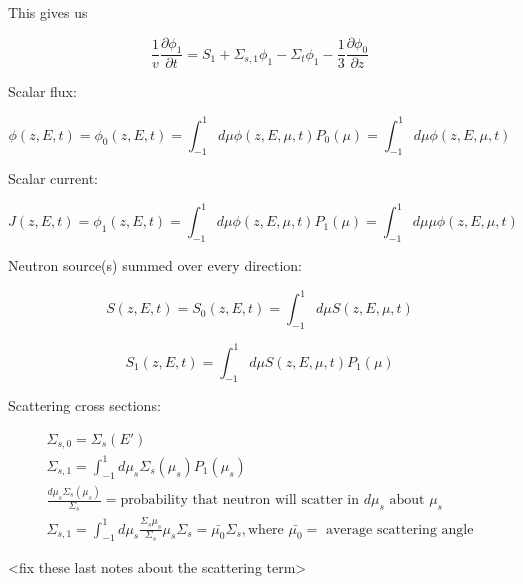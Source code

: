 \documentclass[12pt]{article}
\newcommand{\sigso}{\ensuremath{\Sigma_{s,0}}}
\newcommand{\sigsi}{\ensuremath{\Sigma_{s,1}}}
\begin{document}
This gives us

\begin{equation*}
\frac{1}{v}\frac{\partial\phi_1}{\partial t} = S_1 + \sigsi\phi_1 - \Sigma_t\phi_1 - 
\frac{1}{3}\frac{\partial\phi_0}{\partial z}
\end{equation*}

Scalar flux:

\begin{equation*}
\phi(z,E,t) = \phi_0(z,E,t) = \int_{-1}^{1}d\mu\phi(z,E,\mu,t)P_0(\mu) = \int_{-1}^{1}d\mu\phi(z,E,\mu,t)
\end{equation*}

Scalar current:

\begin{equation*}
J(z,E,t) = \phi_1(z,E,t) = \int_{-1}^{1}d\mu\phi(z,E,\mu,t)P_1(\mu) = \int_{-1}^{1}d\mu\mu\phi(z,E,\mu,t)
\end{equation*}

Neutron source(s) summed over every direction:

\begin{equation*}
S(z,E,t) = S_0(z,E,t) = \int_{-1}^{1}d\mu S(z,E,\mu,t)
\end{equation*}

\begin{equation*}
S_1(z,E,t) = \int_{-1}^1d\mu S(z,E,\mu,t)P_1(\mu)
\end{equation*}

Scattering cross sections:

\begin{gather*}
\sigso = \Sigma_s(E') \\
\sigsi = \int_{-1}^1d\mu_s\Sigma_s(\mu_s)P_1(\mu_s) \\
\frac{d\mu_s\Sigma_s(\mu_s)}{\Sigma_s} = \text{probability that neutron will scatter in $d\mu_s$ about $\mu_s$} \\
\sigsi = \int_{-1}^1d\mu_s\frac{\Sigma_s\mu_s}{\Sigma_s}\mu_s\Sigma_s = \bar{\mu_0}\Sigma_s, 
\text{where $\bar{\mu_0} =$ average scattering angle}
\end{gather*}

<fix these last notes about the scattering term>
\end{document}
